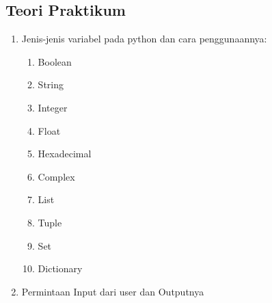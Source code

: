 \subsection{Teori Praktikum}
\begin{enumerate}
\item Jenis-jenis variabel pada python dan cara penggunaannya:

\begin{enumerate}
\item Boolean


\item String


\item Integer


\item Float


\item Hexadecimal


\item Complex


\item List


\item Tuple


\item Set


\item Dictionary


\end{enumerate}

\item Permintaan Input dari user dan Outputnya



\end{enumerate}
